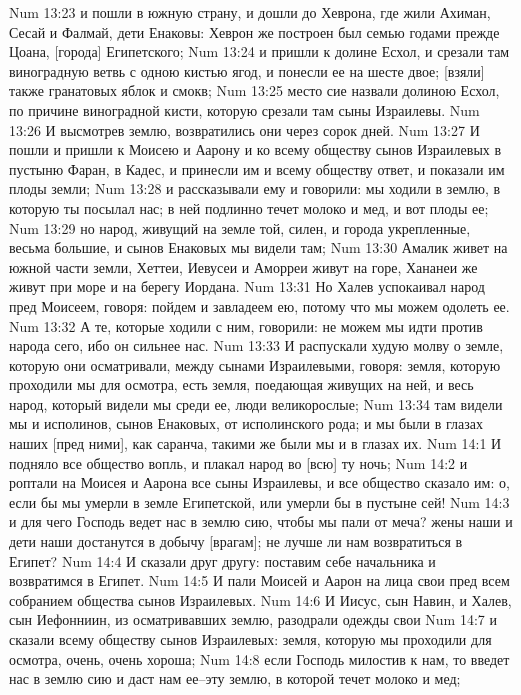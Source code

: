 Num 13:23  и пошли в южную страну, и дошли до Хеврона, где жили Ахиман, Сесай и Фалмай, дети Енаковы: Хеврон же построен был семью годами прежде Цоана, [города] Египетского;
Num 13:24  и пришли к долине Есхол, и срезали там виноградную ветвь с одною кистью ягод, и понесли ее на шесте двое; [взяли] также гранатовых яблок и смокв;
Num 13:25  место сие назвали долиною Есхол, по причине виноградной кисти, которую срезали там сыны Израилевы.
Num 13:26  И высмотрев землю, возвратились они через сорок дней.
Num 13:27  И пошли и пришли к Моисею и Аарону и ко всему обществу сынов Израилевых в пустыню Фаран, в Кадес, и принесли им и всему обществу ответ, и показали им плоды земли;
Num 13:28  и рассказывали ему и говорили: мы ходили в землю, в которую ты посылал нас; в ней подлинно течет молоко и мед, и вот плоды ее;
Num 13:29  но народ, живущий на земле той, силен, и города укрепленные, весьма большие, и сынов Енаковых мы видели там;
Num 13:30  Амалик живет на южной части земли, Хеттеи, Иевусеи и Аморреи живут на горе, Хананеи же живут при море и на берегу Иордана.
Num 13:31  Но Халев успокаивал народ пред Моисеем, говоря: пойдем и завладеем ею, потому что мы можем одолеть ее.
Num 13:32  А те, которые ходили с ним, говорили: не можем мы идти против народа сего, ибо он сильнее нас.
Num 13:33  И распускали худую молву о земле, которую они осматривали, между сынами Израилевыми, говоря: земля, которую проходили мы для осмотра, есть земля, поедающая живущих на ней, и весь народ, который видели мы среди ее, люди великорослые;
Num 13:34  там видели мы и исполинов, сынов Енаковых, от исполинского рода; и мы были в глазах наших [пред ними], как саранча, такими же были мы и в глазах их.
Num 14:1  И подняло все общество вопль, и плакал народ во [всю] ту ночь;
Num 14:2  и роптали на Моисея и Аарона все сыны Израилевы, и все общество сказало им: о, если бы мы умерли в земле Египетской, или умерли бы в пустыне сей!
Num 14:3  и для чего Господь ведет нас в землю сию, чтобы мы пали от меча? жены наши и дети наши достанутся в добычу [врагам]; не лучше ли нам возвратиться в Египет?
Num 14:4  И сказали друг другу: поставим себе начальника и возвратимся в Египет.
Num 14:5  И пали Моисей и Аарон на лица свои пред всем собранием общества сынов Израилевых.
Num 14:6  И Иисус, сын Навин, и Халев, сын Иефонниин, из осматривавших землю, разодрали одежды свои
Num 14:7  и сказали всему обществу сынов Израилевых: земля, которую мы проходили для осмотра, очень, очень хороша;
Num 14:8  если Господь милостив к нам, то введет нас в землю сию и даст нам ее--эту землю, в которой течет молоко и мед;
